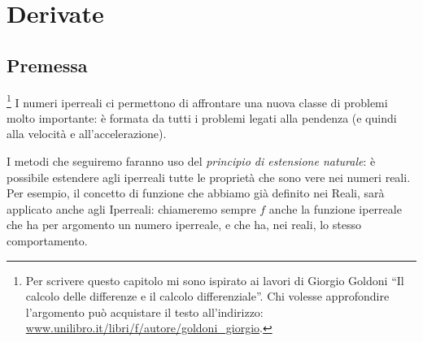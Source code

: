 



\chapter{Derivate}

% 


\section{Premessa}
\footnote{Per scrivere questo capitolo mi sono ispirato 
ai lavori di Giorgio Goldoni ``Il calcolo delle differenze e il calcolo 
differenziale''. 
Chi volesse approfondire l'argomento può acquistare il testo 
all'indirizzo: 
\href{https://www.unilibro.it/libri/f/autore/goldoni\_giorgio}
     {www.unilibro.it/libri/f/autore/goldoni\_giorgio}.}
I numeri iperreali ci permettono di affrontare una nuova classe di problemi 
molto importante: è formata da tutti i problemi legati alla pendenza (e 
quindi alla velocità e all'accelerazione).

I metodi che seguiremo faranno uso del \emph{principio di estensione 
naturale}: è possibile estendere agli iperreali tutte le proprietà che 
sono vere nei numeri reali.
Per esempio, il concetto di funzione che abbiamo già definito nei Reali, 
sarà applicato anche agli Iperreali: chiameremo sempre \(f\) anche
la funzione iperreale che ha per argomento un numero iperreale, 
e che ha, nei reali, lo stesso comportamento.


